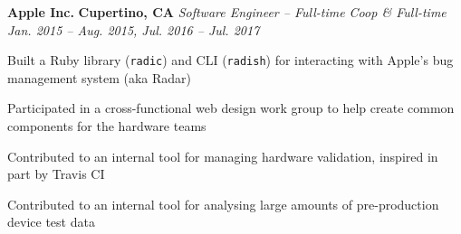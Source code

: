 \item
\headerrow
{\textbf{Apple Inc.}}
{\textbf{Cupertino, CA}}
\headerrow
{\emph{Software Engineer -- Full-time Coop \& Full-time}}
{\emph{Jan. 2015 -- Aug. 2015, Jul. 2016 -- Jul. 2017}}
\begin{itemize*}
    \item Built a Ruby library (\texttt{radic}) and CLI (\texttt{radish}) for
        interacting with Apple's bug management system (aka Radar)
    \item Participated in a cross-functional web design work group to help
        create common components for the hardware teams
    \item Contributed to an internal tool for managing hardware validation,
        inspired in part by Travis CI
    \item Contributed to an internal tool for analysing large amounts of
        pre-production device test data
\end{itemize*}
